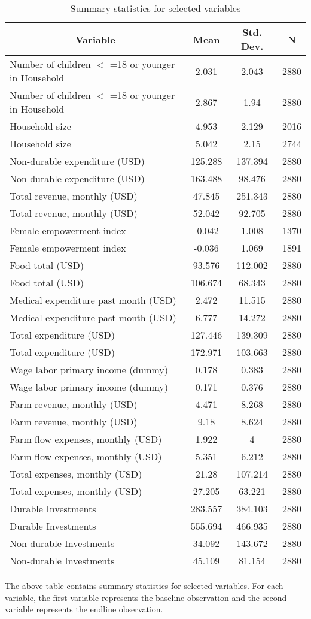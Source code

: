 \documentclass[11pt]{article}
\begin{document}
    \begin{table}[h]\centering \caption{Summary statistics for selected variables  \label{sumstat}}
	\begin{tabular}{l c c  c}\hline\hline
		\multicolumn{1}{c}{\textbf{Variable}} & \textbf{Mean}
		& \textbf{Std. Dev.} & \textbf{N}\\ \hline
    		Number of children $<$ =18 or younger in Household & 2.031 & 2.043  & 2880\\
    		Number of children $<$ =18 or younger in Household & 2.867 & 1.94  & 2880\\
    		Household size & 4.953 & 2.129  & 2016\\
    		Household size & 5.042 & 2.15  & 2744\\
    		Non-durable expenditure (USD) & 125.288 & 137.394  & 2880\\
    		Non-durable expenditure (USD) & 163.488 & 98.476  & 2880\\
    		Total revenue, monthly (USD) & 47.845 & 251.343  & 2880\\
    		Total revenue, monthly (USD) & 52.042 & 92.705  & 2880\\
    		Female empowerment index & -0.042 & 1.008  & 1370\\
    		Female empowerment index & -0.036 & 1.069  & 1891\\
    		Food total (USD) & 93.576 & 112.002  & 2880\\
    		Food total (USD) & 106.674 & 68.343  & 2880\\
    		Medical expenditure past month (USD) & 2.472 & 11.515  & 2880\\
    		Medical expenditure past month (USD) & 6.777 & 14.272  & 2880\\
    		Total expenditure (USD) & 127.446 & 139.309  & 2880\\
    		Total expenditure (USD) & 172.971 & 103.663  & 2880\\
    		Wage labor primary income (dummy) & 0.178 & 0.383  & 2880\\
    		Wage labor primary income (dummy) & 0.171 & 0.376  & 2880\\
    		Farm revenue, monthly (USD) & 4.471 & 8.268  & 2880\\
    		Farm revenue, monthly (USD) & 9.18 & 8.624  & 2880\\
    		Farm flow expenses, monthly (USD) & 1.922 & 4  & 2880\\
    		Farm flow expenses, monthly (USD) & 5.351 & 6.212  & 2880\\
    		Total expenses, monthly (USD) & 21.28 & 107.214  & 2880\\
    		Total expenses, monthly (USD) & 27.205 & 63.221  & 2880\\
    		Durable Investments & 283.557 & 384.103  & 2880\\
    		Durable Investments & 555.694 & 466.935  & 2880\\
    		Non-durable Investments & 34.092 & 143.672  & 2880\\
    		Non-durable Investments & 45.109 & 81.154  & 2880\\
    		\hline
    	\end{tabular}
    \end{table}

The above table contains summary statistics for selected variables. For each variable, the first variable represents the baseline observation and the second variable represents the endline observation. 
\end{document}
